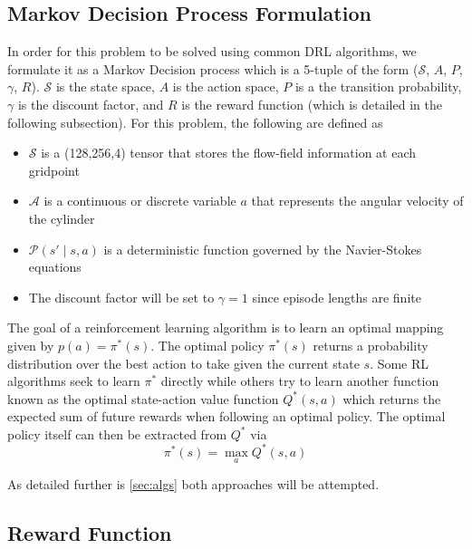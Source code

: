 \documentclass{article}
\begin{document}
\subsection{Markov Decision Process Formulation}
In order for this problem to be solved using common DRL algorithms, we formulate it as a Markov Decision process which is a 5-tuple of the form ($\mathcal{S}$, $A$, $P$, $\gamma$, $R$). $\mathcal{S}$ is the state space, $A$ is the action space, $P$ is a the transition probability, $\gamma$ is the discount factor, and $R$ is the reward function (which is detailed in the following subsection). For this problem, the following are defined as
\begin{itemize}
\item $\mathcal{S}$ is a (128,256,4) tensor that stores the flow-field information at each gridpoint
\item $\mathcal{A}$ is a continuous or discrete variable $a$ that represents the angular velocity of the cylinder
\item $\mathcal{P}(s' \mid s, a)$ is a deterministic function governed by the Navier-Stokes equations
\item The discount factor will be set to $\gamma = 1$ since episode lengths are finite
\end{itemize}

The goal of a reinforcement learning algorithm is to learn an optimal mapping given by $p(a) = \pi^*(s)$. The optimal policy $\pi^*(s)$ returns a probability distribution over the best action to take given the current state $s$. Some RL algorithms seek to learn $\pi^*$ directly while others try to learn another function known as the optimal state-action value function $Q^*(s,a)$ which returns the expected sum of future rewards when following an optimal policy. The optimal policy itself can then be extracted from $Q^*$ via
\begin{equation} \pi^*(s) = \max_{a} Q^*(s,a) \end{equation}

As detailed further is \cref{sec:algs} both approaches will be attempted.

\subsection{Reward Function}


\end{document}
